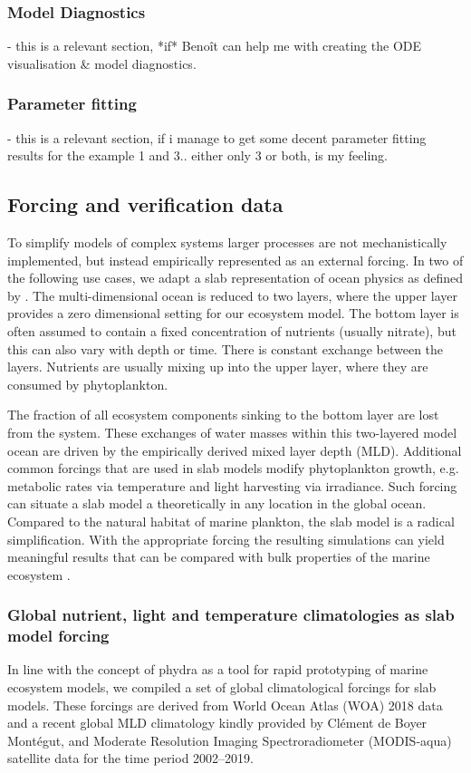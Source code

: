 \documentclass[template.tex]{subfiles}
\begin{document}
\subsubsection{Model Diagnostics}
- this is a relevant section, *if* Benoît can help me with creating the ODE visualisation & model diagnostics.

\subsubsection{Parameter fitting}
- this is a relevant section, if i manage to get some decent parameter fitting results for the example 1 and 3.. either only 3 or both, is my feeling. 



\subsection{Forcing and verification data} \label{Section:ForcingSection}

To simplify models of complex systems larger processes are not mechanistically implemented, but instead empirically represented as an external forcing. In two of the following use cases, we adapt a slab representation of ocean physics as defined by \citet{Evans1985ACycles}. The multi-dimensional ocean is reduced to two layers, where the upper layer provides a zero dimensional setting for our ecosystem model. The bottom layer is often assumed to contain a fixed concentration of nutrients (usually nitrate), but this can also vary with depth or time. There is constant exchange between the layers. Nutrients are usually mixing up into the upper layer, where they are consumed by phytoplankton. 

The fraction of all ecosystem components sinking to the bottom layer are lost from the system. These exchanges of water masses within this two-layered model ocean are driven by the empirically derived mixed layer depth (MLD). Additional common forcings that are used in slab models modify phytoplankton growth, e.g. metabolic rates via temperature and light harvesting via irradiance. Such forcing can situate a slab model a theoretically in any location in the global ocean. Compared to the natural habitat of marine plankton, the slab model is a radical simplification. With the appropriate forcing the resulting simulations can yield meaningful results that can be compared with bulk properties of the marine ecosystem \cite[e.g.][]{Evans1985ACycles, Fasham1990a}. 

\subsubsection{Global nutrient, light and temperature climatologies as slab model forcing}
In line with the concept of phydra as a tool for rapid prototyping of marine ecosystem models, we compiled a set of global climatological forcings for slab models. These forcings are derived from World Ocean Atlas (WOA) 2018 data and a recent global MLD climatology kindly provided by Clément de Boyer Montégut, and Moderate Resolution Imaging Spectroradiometer (MODIS-aqua) satellite data for the time period 2002–2019.
\end{document}
